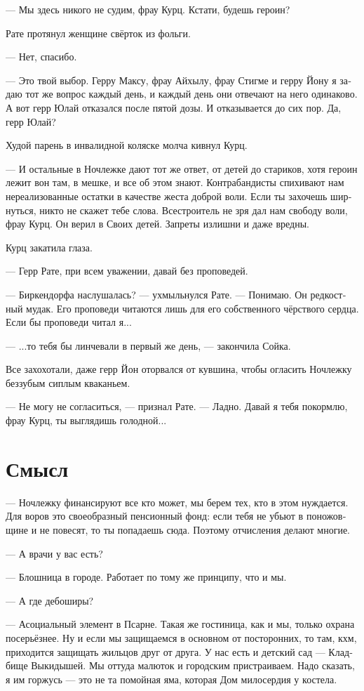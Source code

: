 \documentclass[a4paper,12pt,fleqn]{book}\usepackage{polyglossia}\setdefaultlanguage[babelshorthands=true]{russian}\setotherlanguage{english}\defaultfontfeatures{Ligatures=TeX,Mapping=tex-text}\usepackage{xcolor}\newcommand{\ml}[3]{#2}
\begin{document}
--- Мы здесь никого не судим, фрау Курц.
Кстати, будешь героин?

Рате протянул женщине свёрток из фольги.

--- Нет, спасибо.

--- Это твой выбор.
Герру Максу, фрау Айхылу, фрау Стигме и герру Йону я задаю тот же вопрос каждый день, и каждый день они отвечают на него одинаково.
А вот герр Юлай отказался после пятой дозы.
И отказывается до сих пор.
Да, герр Юлай?

Худой парень в инвалидной коляске молча кивнул Курц.

--- И остальные в Ночлежке дают тот же ответ, от детей до стариков, хотя героин лежит вон там, в мешке, и все об этом знают.
Контрабандисты спихивают нам нереализованные остатки в качестве жеста доброй воли.
Если ты захочешь ширнуться, никто не скажет тебе слова.
Всестроитель не зря дал нам свободу воли, фрау Курц.
Он верил в Своих детей.
Запреты излишни и даже вредны.

Курц закатила глаза.

--- Герр Рате, при всем уважении, давай без проповедей.

--- Биркендорфа наслушалась? --- ухмыльнулся Рате.
--- Понимаю.
Он редкостный мудак.
Его проповеди читаются лишь для его собственного чёрствого сердца.
Если бы проповеди читал я...

--- ...то тебя бы линчевали в первый же день, --- закончила Сойка.

Все захохотали, даже герр Йон оторвался от кувшина, чтобы огласить Ночлежку беззубым сиплым кваканьем.

--- Не могу не согласиться, --- признал Рате.
--- Ладно.
Давай я тебя покормлю, фрау Курц, ты выглядишь голодной...

\section{Смысл}

--- Ночлежку финансируют все кто может, мы берем тех, кто в этом нуждается.
Для воров это своеобразный пенсионный фонд: если тебя не убьют в поножовщине и не повесят, то ты попадаешь сюда.
Поэтому отчисления делают многие.

--- А врачи у вас есть?

--- Блошница в городе.
Работает по тому же принципу, что и мы.

--- А где дебоширы?

--- Асоциальный элемент в Псарне.
Такая же гостиница, как и мы, только охрана посерьёзнее.
Ну и если мы защищаемся в основном от посторонних, то там, кхм, приходится защищать жильцов друг от друга.
У нас есть и детский сад --- Кладбище Выкидышей.
Мы оттуда малюток и городским пристраиваем.
Надо сказать, я им горжусь --- это не та помойная яма, которая Дом милосердия у костела.
\end{document}
